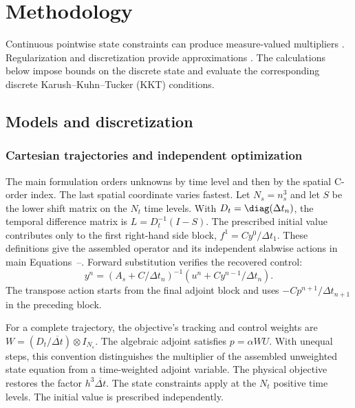 \section{Methodology}\label{si:methodology}
Continuous pointwise state constraints can produce measure-valued
multipliers \citep{casas1986control}. Regularization and discretization
provide approximations \citep{meyer2006optimal,ito2003semi,deckelnick2009convergence}.
The calculations below impose bounds on the discrete state and evaluate
the corresponding discrete Karush--Kuhn--Tucker (KKT) conditions.

\subsection{Models and discretization}


\subsubsection{Cartesian trajectories and independent optimization}
\label{si:transient}
The main formulation orders unknowns by time level and then by the
spatial C-order index. The last spatial coordinate varies fastest.
Let $N_s=n_s^3$ and let $S$ be the lower shift matrix on the
$N_t$ time levels. With $D_t=\diag(\Delta t_n)$, the temporal
difference matrix is $L=D_t^{-1}(I-S)$.
The prescribed initial value contributes only to the first right-hand
side block, $f^1=Cy^0/\Delta t_1$. These definitions give the
assembled operator and its independent slabwise actions in main
Equations~--.
Forward substitution verifies the recovered control:
\[
 y^n=(A_s+C/\Delta t_n)^{-1}
       \left(u^n+Cy^{n-1}/\Delta t_n\right).
\]
The transpose action starts from the final adjoint block and uses
$-Cp^{n+1}/\Delta t_{n+1}$ in the preceding block.

For a complete trajectory, the objective's tracking and control
weights are $W=(D_t/\overline{\Delta t})\otimes I_{N_s}$.
The algebraic adjoint satisfies $p=\alpha WU$. With unequal steps,
this convention distinguishes the multiplier of the assembled
unweighted state equation from a time-weighted adjoint variable.
The physical objective restores the factor
$h^3\overline{\Delta t}$. The state constraints apply at the
$N_t$ positive time levels. The initial value is prescribed
independently.

